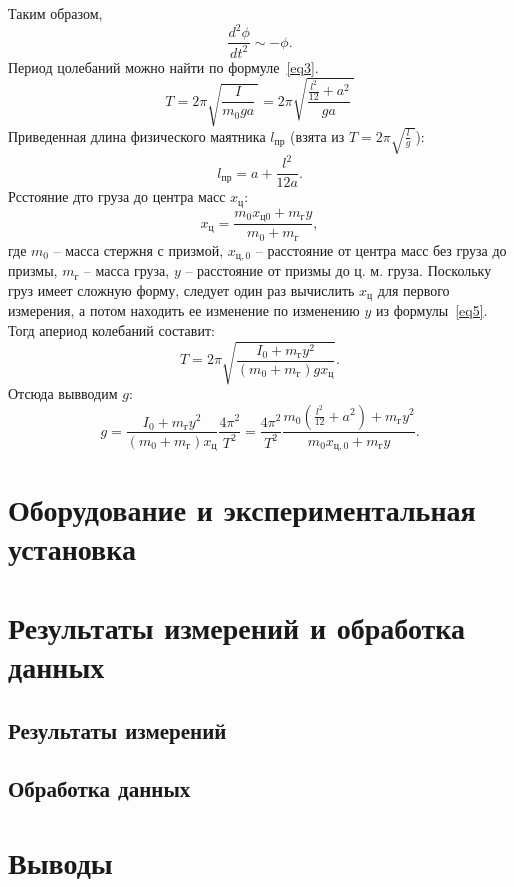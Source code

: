 \documentclass[a4paper,11pt]{article}
\begin{document}
Таким образом,
$$\frac{d^{2}\phi}{dt^{2}} \sim - \phi.$$
Период цолебаний можно найти по формуле~\ref{eq3}.
\begin{equation}    \label{eq3}
  T = 2 \pi \sqrt{\frac{I}{m_{0}ga}\ } = 2 \pi \sqrt{\frac{\frac{l^{2}}{12} + a^{2}}{ga}\ }
\end{equation}
Приведенная длина физического маятника $l_{пр}$ (взята из $T = 2 \pi \sqrt{\frac{l}{g}\ }$):
\begin{equation}    \label{eq4}
  l_{пр} = a + \frac{l^{2}}{12a}.
\end{equation}
Рсстояние дто груза до центра масс $x_{ц}$:
\begin{equation}    \label{eq5}
  x_{ц} = \frac{m_{0}x_{ц 0} + m_{г}y}{m_{0} + m_{г}},
\end{equation}
где $m_{0}$ -- масса стержня с призмой, $x_{ц,0}$ -- расстояние от центра масс без груза до призмы, $m_{г}$ -- масса груза, $y$ -- расстояние от призмы до ц. м. груза.\newline
Поскольку груз имеет сложную форму, следует один раз вычислить $x_{ц}$ для первого измерения, а потом находить ее изменение по изменению $y$ из формулы~\ref{eq5}. Тогд апериод колебаний составит:
\begin{equation}    \label{eq6}
  T = 2 \pi \sqrt{\frac{I_{0} + m_{г} y^{2}}{(m_{0} + m_{г}) g x_{ц}}}.
\end{equation}
Отсюда вывводим $g$:
\begin{equation}    \label{eq7}
  g = \frac{I_{0} + m_{г}y^{2}}{(m_{0} + m_{г}) x_{ц}} \frac{4 \pi^{2}}{T^{2}} = \frac{4 \pi^{2}}{T^{2}} \frac{m_{0}(\frac{l^{2}}{12} + a^{2}) + m_{г} y^{2}}{m_{0}x_{ц,0} + m_{г}y}.
\end{equation}
\section{Оборудование и экспериментальная установка}
\section{Результаты измерений и обработка данных}
\subsection{Результаты измерений}
\subsection{Обработка данных}
\section{Выводы}
\end{document}
